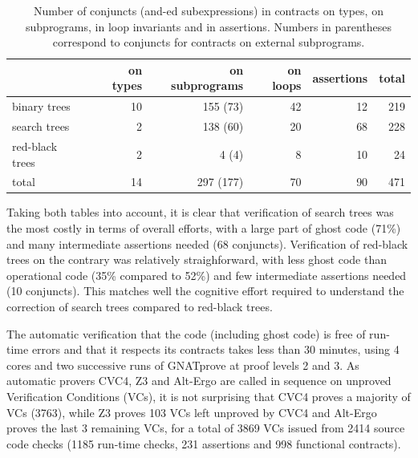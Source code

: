 \documentclass{llncs}
\begin{document}
\vspace{-0.5cm}
\begin{table}[h]
\begin{center}
\begin{tabular}{l|rrrr|r}
                & on types & on subprograms & on loops & assertions & total \\ \hline
binary trees    & 10       & 155 (73)       & 42       & 12         & 219 \\
search trees    & 2        & 138 (60)       & 20       & 68         & 228 \\
red-black trees & 2        & 4 (4)          & 8        & 10         & 24 \\ \hline
total           & 14       & 297 (177)      & 70       & 90         & 471
\end{tabular}
\vspace*{5mm}
\caption{\label{tab-sloc2} Number of conjuncts (and-ed subexpressions) in contracts on types, on
  subprograms, in loop invariants and in assertions. Numbers in parentheses
  correspond to conjuncts for contracts on external subprograms.}
\vspace*{-10mm}
\end{center}
\end{table}

Taking both tables into account, it is clear that verification of search trees
was the most costly in terms of overall efforts, with a large part of ghost
code (71\%) and many intermediate assertions needed (68
conjuncts). Verification of red-black trees on the contrary was relatively
straighforward, with less ghost code than operational code (35\% compared to
52\%) and few intermediate assertions needed (10 conjuncts). This matches well
the cognitive effort required to understand the correction of search trees
compared to red-black trees.

The automatic verification that the code (including ghost code) is free of
run-time errors and that it respects its contracts takes less than 30 minutes,
using 4 cores and two successive runs
of GNATprove at proof levels 2 and 3. As automatic provers CVC4, Z3 and
Alt-Ergo are called in sequence on unproved Verification Conditions (VCs), it
is not surprising that CVC4 proves a majority of VCs (3763), while Z3 proves
103 VCs left unproved by CVC4 and Alt-Ergo proves the last 3 remaining VCs, for
a total of 3869 VCs issued from 2414 source code checks (1185 run-time checks,
231 assertions and 998 functional contracts).
\end{document}
